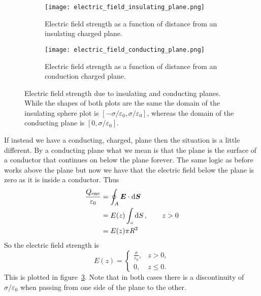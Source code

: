     \begin{figure}[ht]
        \centering
        \begin{subfigure}{0.4\textwidth}
            \centering
            \texttt{[image: electric\_field\_insulating\_plane.png]}
            \caption{Electric field strength as a function of distance from an insulating charged plane.}
            \label{fig:electric field insulated plane}
        \end{subfigure}
        \begin{subfigure}{0.4\textwidth}
            \centering
            \texttt{[image: electric\_field\_conducting\_plane.png]}
            \caption{Electric field strength as a function of distance from an conduction charged plane.}
            \label{fig:electric field conducting plane}
        \end{subfigure}
        \caption{Electric field strength due to insulating and conducting planes. While the shapes of both plots are the same the domain of the insulating sphere plot is \([-\sigma/\varepsilon_0, \sigma/\varepsilon_0]\), whereas the domain of the conducting plane is \([0, \sigma/\varepsilon_0]\).}
    \end{figure}

    If instead we have a conducting, charged, plane then the situation is a little different.
    By a conducting plane what we mean is that the plane is the surface of a conductor that continues on below the plane forever.
    The same logic as before works above the plane but now we have that the electric field below the plane is zero as it is inside a conductor.
    Thus
    \begin{align*}
        \frac{Q_\mathrm{enc}}{\varepsilon_0} &= \oint_A\bm{E}\cdot\dd{\bm{S}}\\
        &= E(z)\int_\circ \dd{S},\qquad z > 0\\
        &= E(z)\pi R^2\\
    \end{align*}
    So the electric field strength is
    \[
        E(z) = \begin{cases}
            \frac{\sigma}{\varepsilon_0}, & z > 0,\\
            0, & z \le 0.
        \end{cases}
    \]
    This is plotted in figure~\ref{fig:electric field conducting plane}.
    Note that in both cases there is a discontinuity of \(\sigma/\varepsilon_0\) when passing from one side of the plane to the other.
    
